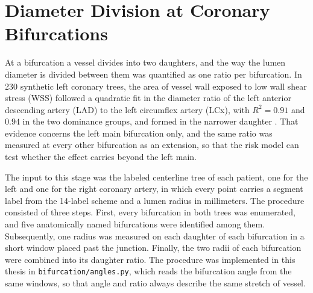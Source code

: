 
\section{Diameter Division at Coronary Bifurcations}
\label{sec:daughter-ratio}

At a bifurcation a vessel divides into two daughters, and the way the lumen diameter is divided between them was quantified as one ratio per bifurcation.
In 230 synthetic left coronary trees, the area of vessel wall exposed to low wall shear stress (WSS) followed a quadratic fit in the diameter ratio of the left anterior descending artery (LAD) to the left circumflex artery (LCx), with $R^2 = 0.91$ and $0.94$ in the two dominance groups, and formed in the narrower daughter \cite{garcha2025sensitivity}.
That evidence concerns the left main bifurcation only, and the same ratio was measured at every other bifurcation as an extension, so that the risk model can test whether the effect carries beyond the left main.

The input to this stage was the labeled centerline tree of each patient, one for the left and one for the right coronary artery, in which every point carries a segment label from the 14-label scheme and a lumen radius in millimeters.
The procedure consisted of three steps.
First, every bifurcation in both trees was enumerated, and five anatomically named bifurcations were identified among them.
Subsequently, one radius was measured on each daughter of each bifurcation in a short window placed past the junction.
Finally, the two radii of each bifurcation were combined into its daughter ratio.
The procedure was implemented in this thesis in \texttt{bifurcation/angles.py}, which reads the bifurcation angle from the same windows, so that angle and ratio always describe the same stretch of vessel.

